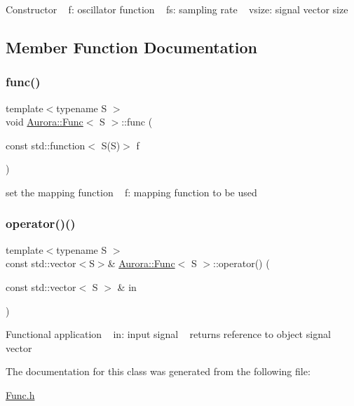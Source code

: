 Constructor ~\newline
f\+: oscillator function ~\newline
fs\+: sampling rate ~\newline
vsize\+: signal vector size 

\subsection{Member Function Documentation}
\mbox{\label{class_aurora_1_1_func_ad0b316fc635de73ddcd75f97293c10d9}} 
\subsubsection{\texorpdfstring{func()}{func()}}
{\footnotesize\ttfamily template$<$typename S $>$ \\
void \hyperlink{class_aurora_1_1_func}{Aurora\+::\+Func}$<$ S $>$\+::func (\begin{DoxyParamCaption}\item[{const std\+::function$<$ S(S)$>$}]{f }\end{DoxyParamCaption})\hspace{0.3cm}{\ttfamily [inline]}}

set the mapping function ~\newline
f\+: mapping function to be used \mbox{\label{class_aurora_1_1_func_a60e9dad421d80a9f9eb99cfbac104729}} 
\subsubsection{\texorpdfstring{operator()()}{operator()()}}
{\footnotesize\ttfamily template$<$typename S $>$ \\
const std\+::vector$<$S$>$\& \hyperlink{class_aurora_1_1_func}{Aurora\+::\+Func}$<$ S $>$\+::operator() (\begin{DoxyParamCaption}\item[{const std\+::vector$<$ S $>$ \&}]{in }\end{DoxyParamCaption})\hspace{0.3cm}{\ttfamily [inline]}}

Functional application ~\newline
in\+: input signal ~\newline
returns reference to object signal vector 

The documentation for this class was generated from the following file\+:\begin{DoxyCompactItemize}
\item 
\hyperlink{_func_8h}{Func.\+h}\end{DoxyCompactItemize}
